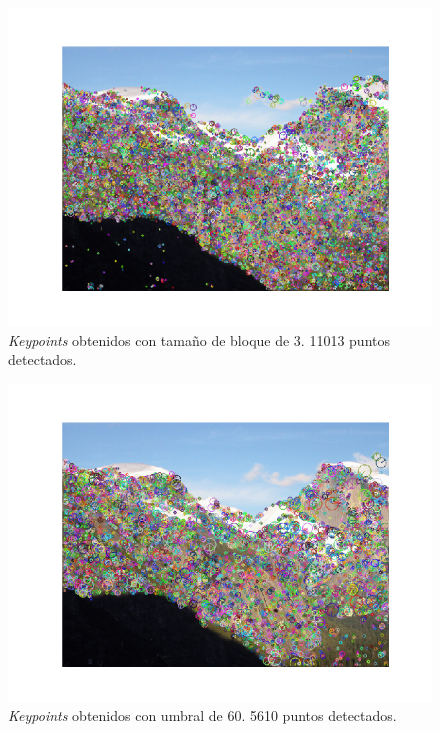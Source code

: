 \documentclass[11pt,a4paper]{article}
\begin{document}
\begin{figure}[H]
	\centering
	\includegraphics[scale=0.6]{img/kp-block}
	\caption{\textit{Keypoints} obtenidos con tamaño de bloque de 3. 11013 puntos detectados.}
	\label{fig:kp-block}
\end{figure}

\begin{figure}[H]
	\centering
	\includegraphics[scale=0.6]{img/kp-thresh60}
	\caption{\textit{Keypoints} obtenidos con umbral de 60. 5610 puntos detectados.}
	\label{fig:kp-thresh60}
\end{figure}
\end{document}
